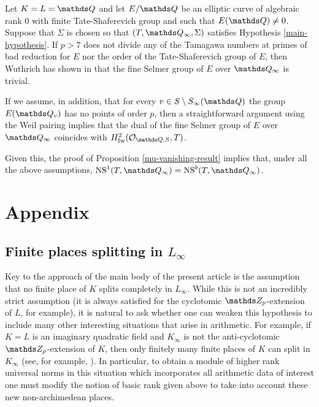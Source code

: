 \documentclass[a4paper, 
headsepline=off, DIV=12, titlepage=false]{scrartcl}
\begin{document}
\begin{remark}
    Let $K = L = \QQ$ and let $E/\QQ$ be an elliptic curve of algebraic rank 0 with finite Tate-Shaferevich group and such that $E(\QQ) \neq 0$. Suppose that $\Sigma$ is chosen so that $(T, \QQ_\infty, \Sigma)$ satisfies Hypothesis \ref{main-hypothesis}. If $p > 7$ does not divide any of the Tamagawa numbers at primes of bad reduction for $E$ nor the order of the Tate-Shaferevich group of $E$, then Wuthrich has shown in \cite[Prop. 9.1]{wuthrich} that the fine Selmer group of $E$ over $\QQ_\infty$ is trivial.
    
    If we assume, in addition, that for every $v \in S\setminus S_\infty(\QQ)$ the group $E(\QQ_v)$ has no points of order $p$, then a straightforward argument using the Weil pairing implies that the dual of the fine Selmer group of $E$ over $\QQ_\infty$ coincides with $H^2_\Iw(\cO_{\Q,S}, T)$.
    
    Given this, the proof of Proposition \ref{mu-vanishing-result} implies that, under all the above assumptions, $\NS^1(T,\QQ_\infty) = \NS^b(T,\QQ_\infty)$.
\end{remark}

\section*{Appendix}



\renewcommand{\thesubsection}{\Alph{subsection}}
\renewcommand{\thethm}{(\Alph{subsection}.\arabic{thm})}
\setcounter{subsection}{0}

\subsection{Finite places splitting in $L_\infty$}


Key to the approach of the main body of the present article is the assumption that no finite place of $K$ splits completely in $L_\infty$. While this is not an incredibly strict assumption (it is always satisfied for the cyclotomic $\ZZ_p$-extension of $L$, for example), it is natural to ask whether one can weaken this hypothesis to include many other interesting situations that arise in arithmetic. 
For example, if $K = L$ is an imaginary quadratic field and $K_\infty$ is not the anti-cyclotomic $\ZZ_p$-extension of $K$, then only finitely many finite places of $K$ can split in $K_\infty$ (see, for example, \cite{emsalem}). 
In particular, to obtain a module of higher rank universal norms in this situation which incorporates all arithmetic data of interest one must modify the notion of basic rank given above to take into account these new non-archimedean places.\\
\end{document}
